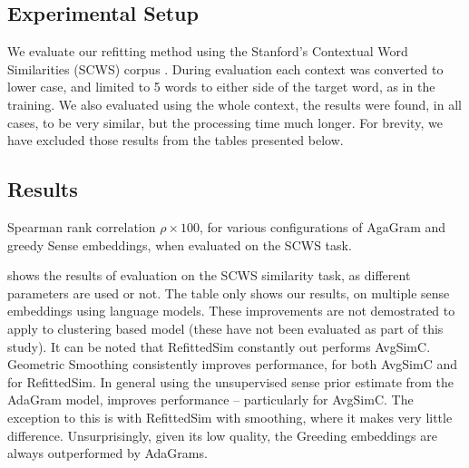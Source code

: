 \documentclass{sig-alternate}
\begin{document}
\subsection{Experimental Setup}
We evaluate our refitting method using the Stanford's Contextual Word Similarities (SCWS) corpus \parencite{Huang2012}.
During evaluation each context was converted to lower case, and limited to 5 words to either side of the target word, as in the training.
We also evaluated using the whole context, the results were found, in all cases, to be very similar, but the processing time much longer.
For brevity, we have excluded those results from the tables presented below.


\subsection{Results}

\begin{table}
	\begin{adjustbox}{max width=\columnwidth}
	\end{adjustbox}
\caption{Spearman rank correlation $\rho \times 100$, for various configurations of AgaGram and greedy Sense embeddings, when evaluated on the SCWS task.} \label{swscres}
\end{table}

 shows the results of evaluation on the SCWS similarity task, as different parameters are used or not. The table only shows our results, on multiple sense embeddings using language models. These improvements are not demostrated to apply to clustering based model (these have not been evaluated as part of this study). 
It can be noted that RefittedSim constantly out performs AvgSimC.
Geometric Smoothing consistently improves performance, for both AvgSimC and for RefittedSim.
In general using the unsupervised sense prior estimate from the AdaGram model, improves performance -- particularly for AvgSimC. The exception to this is with RefittedSim with smoothing, where it makes very little difference. 
Unsurprisingly, given its low quality, the Greeding embeddings are always outperformed by AdaGrams.
\end{document}
